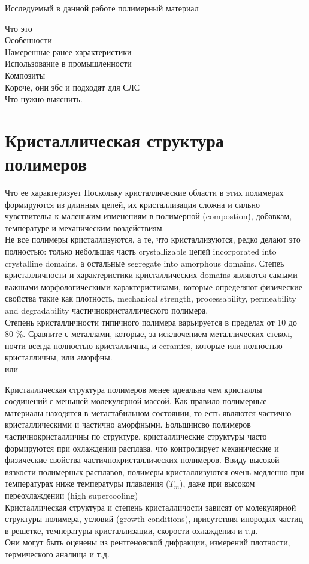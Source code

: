 Исследуемый в данной работе полимерный материал 


Что это\\
Особенности\\
Намеренные ранее характеристики\\
Использование в промышленности\\
Композиты\\
Короче, они збс и подходят для СЛС\\
Что нужно выяснить.\\

\section{Кристаллическая структура полимеров}

Что ее характеризует
Поскольку кристаллические области в этих полимерах формируются из длинных цепей, их кристаллизация сложна и сильно чувствительа к маленьким изменениям в полимерной (compostion), добавкам, температуре и механическим воздействиям.\\
Не все полимеры кристаллизуются, а те, что кристаллизуются, редко делают это полностью: только небольшая часть crystallizable цепей incorporated into crystalline domains, а остальные segregate into amorphous domains. Степеь кристалличности и характеристики кристаллических domains являются самыми важными морфологическими характеристиками, которые определяют физические свойства такие как плотность, mechanical strength, processability, permeability and degradability частичнокристаллического полимера.\\
Степень кристалличности типичного полимера варьируется в пределах от 10 до 80 \%. Сравните с металлами, которые, за исключением металлических стекол, почти всегда полностью кристалличны, и ceramics, которые или полностью кристалличны, или аморфны.\\ \cite{cryst3} или \cite{cryst1}






Кристаллическая структура полимеров менее идеальна чем кристаллы соединений с меньшей молекулярной массой. Как правило полимерные материалы находятся в метастабильном состоянии, то есть являются частично кристаллическими и частично аморфными. Большинсво полимеров частичнокристалличны по структуре, кристаллические структуры часто формируются при охлаждении расплава, что контролирует механические и физические свойства частичнокристаллических полимеров. Ввиду высокой вязкости полимерных расплавов, полимеры кристаллизуются очень медленно при температурах ниже температуры плавления ($T_m$), даже при высоком переохлаждении (high supercooling)
\\
Кристаллическая структура и степень кристалличости зависят от молекулярной структуры полимера, условий (growth
conditions), присутствия инородых частиц в решетке, температуры кристаллизации, скорости охлаждения и т.д.\\
Они могут быть оценены из рентгеновской дифракции, измерений плотности, термического аналища и т.д.


